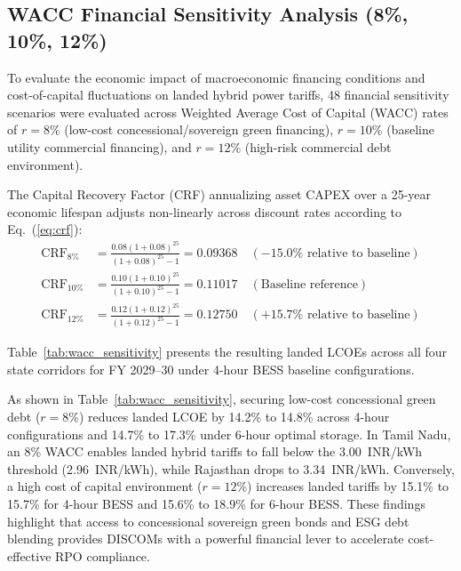 \documentclass[11pt,a4paper]{article}
\begin{document}
\subsection{WACC Financial Sensitivity Analysis (8\%, 10\%, 12\%)}
\label{sec:wacc_sensitivity}

To evaluate the economic impact of macroeconomic financing conditions and cost-of-capital fluctuations on landed hybrid power tariffs, 48 financial sensitivity scenarios were evaluated across Weighted Average Cost of Capital (WACC) rates of $r = 8\%$ (low-cost concessional/sovereign green financing), $r = 10\%$ (baseline utility commercial financing), and $r = 12\%$ (high-risk commercial debt environment).

The Capital Recovery Factor (CRF) annualizing asset CAPEX over a 25-year economic lifespan adjusts non-linearly across discount rates according to Eq.~(\ref{eq:crf}):
\begin{align}
\text{CRF}_{8\%} &= \frac{0.08(1+0.08)^{25}}{(1+0.08)^{25}-1} = 0.09368 \quad (-15.0\% \text{ relative to baseline}) \label{eq:crf_8} \\
\text{CRF}_{10\%} &= \frac{0.10(1+0.10)^{25}}{(1+0.10)^{25}-1} = 0.11017 \quad (\text{Baseline reference}) \label{eq:crf_10} \\
\text{CRF}_{12\%} &= \frac{0.12(1+0.12)^{25}}{(1+0.12)^{25}-1} = 0.12750 \quad (+15.7\% \text{ relative to baseline}) \label{eq:crf_12}
\end{align}

Table~\ref{tab:wacc_sensitivity} presents the resulting landed LCOEs across all four state corridors for FY 2029--30 under 4-hour BESS baseline configurations.



As shown in Table~\ref{tab:wacc_sensitivity}, securing low-cost concessional green debt ($r = 8\%$) reduces landed LCOE by 14.2\% to 14.8\% across 4-hour configurations and 14.7\% to 17.3\% under 6-hour optimal storage. In Tamil Nadu, an 8\% WACC enables landed hybrid tariffs to fall below the 3.00~INR/kWh threshold (2.96~INR/kWh), while Rajasthan drops to 3.34~INR/kWh. Conversely, a high cost of capital environment ($r = 12\%$) increases landed tariffs by 15.1\% to 15.7\% for 4-hour BESS and 15.6\% to 18.9\% for 6-hour BESS. These findings highlight that access to concessional sovereign green bonds and ESG debt blending provides DISCOMs with a powerful financial lever to accelerate cost-effective RPO compliance.

\end{document}
